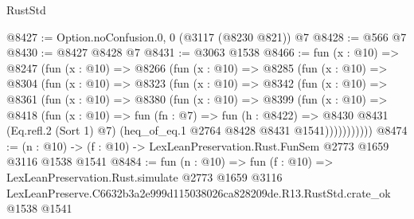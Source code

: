 \begin{lexlean}{RustStd}
\begin{coremodule}
@8427 := Option.noConfusion.{0, 0} (@3117 (@8230 @821)) @7
@8428 := @566 @7
@8430 := @8427 @8428 @7
@8431 := @3063 @1538
@8466 := fun (x : @10) =>
  @8247
    (fun (x : @10) =>
    @8266
      (fun (x : @10) =>
      @8285
        (fun (x : @10) =>
        @8304
          (fun (x : @10) =>
          @8323
            (fun (x : @10) =>
            @8342
              (fun (x : @10) =>
              @8361
                (fun (x : @10) =>
                @8380
                  (fun (x : @10) =>
                  @8399
                    (fun (x : @10) =>
                    @8418
                      (fun (x : @10) =>
                      fun (fn : @7) =>
                      fun (h : @8422) =>
                      @8430
                        @8431
                        (Eq.refl.{2} (Sort 1) @7)
                        (heq_of_eq.{1} @2764 @8428 @8431 @1541)))))))))))
@8474 := (n : @10) -> (f : @10) -> LexLeanPreservation.Rust.FunSem @2773 @1659 @3116 @1538 @1541
@8484 := fun (n : @10) =>
  fun (f : @10) =>
  LexLeanPreservation.Rust.simulate
    @2773
    @1659
    @3116
    LexLeanPreserve.C6632b3a2e999d115038026ca828209de.R13.RustStd.crate_ok
    @1538
    @1541
\end{coremodule}
\end{lexlean}
